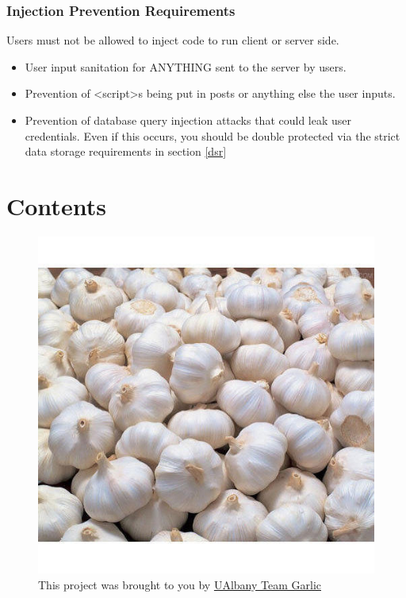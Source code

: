 \documentclass[]{article}
\begin{document}
\subsubsection{Injection Prevention Requirements}
Users must not be allowed to inject code to run client or server side.
\begin{itemize}
    \item User input sanitation for ANYTHING sent to the server by users.
    \item Prevention of <script>s being put in posts or anything else the user inputs.
    \item Prevention of database query injection attacks that could leak user credentials. Even if this occurs, you should be double protected via the strict data storage requirements in section \ref{dsr}
\end{itemize}


\newpage
\section{Contents}\label{cont}
\tableofcontents
\vspace{8cm}
\begin{figure}[!h]
    \centering
    \includegraphics[scale=0.3]{Garlic.jpg}
    \caption{This project was brought to you by \href{https://github.com/UAlbany-Team-Garlic}{UAlbany Team Garlic}}
\end{figure}
\end{document}
